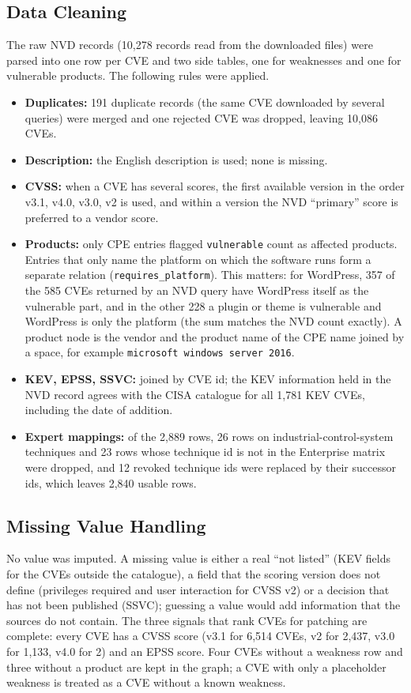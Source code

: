\documentclass[12pt, a4paper]{article}
\begin{document}
\subsection{Data Cleaning}
The raw NVD records (10,278 records read from the downloaded files) were parsed into one row per CVE and two side tables, one for weaknesses and one for vulnerable products. The following rules were applied.
\begin{itemize}[noitemsep, topsep=2pt]
    \item \textbf{Duplicates:} 191 duplicate records (the same CVE downloaded by several queries) were merged and one rejected CVE was dropped, leaving 10,086 CVEs.
    \item \textbf{Description:} the English description is used; none is missing.
    \item \textbf{CVSS:} when a CVE has several scores, the first available version in the order v3.1, v4.0, v3.0, v2 is used, and within a version the NVD ``primary'' score is preferred to a vendor score.
    \item \textbf{Products:} only CPE entries flagged \texttt{vulnerable} count as affected products. Entries that only name the platform on which the software runs form a separate relation (\texttt{requires\_platform}). This matters: for WordPress, 357 of the 585 CVEs returned by an NVD query have WordPress itself as the vulnerable part, and in the other 228 a plugin or theme is vulnerable and WordPress is only the platform (the sum matches the NVD count exactly). A product node is the vendor and the product name of the CPE name joined by a space, for example \texttt{microsoft windows server 2016}.
    \item \textbf{KEV, EPSS, SSVC:} joined by CVE id; the KEV information held in the NVD record agrees with the CISA catalogue for all 1,781 KEV CVEs, including the date of addition.
    \item \textbf{Expert mappings:} of the 2,889 rows, 26 rows on industrial-control-system techniques and 23 rows whose technique id is not in the Enterprise matrix were dropped, and 12 revoked technique ids were replaced by their successor ids, which leaves 2,840 usable rows.
\end{itemize}
\subsection{Missing Value Handling}
No value was imputed. A missing value is either a real ``not listed'' (KEV fields for the CVEs outside the catalogue), a field that the scoring version does not define (privileges required and user interaction for CVSS v2) or a decision that has not been published (SSVC); guessing a value would add information that the sources do not contain. The three signals that rank CVEs for patching are complete: every CVE has a CVSS score (v3.1 for 6,514 CVEs, v2 for 2,437, v3.0 for 1,133, v4.0 for 2) and an EPSS score. Four CVEs without a weakness row and three without a product are kept in the graph; a CVE with only a placeholder weakness is treated as a CVE without a known weakness.
\end{document}
